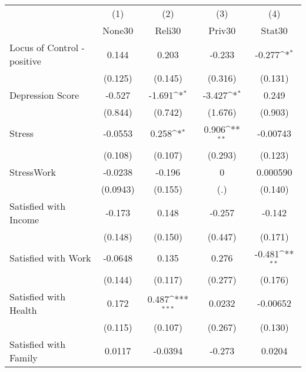 {
\def\sym#1{\ifmmode^{#1}\else\(^{#1}\)\fi}
\begin{tabular}{l*{4}{c}}
\hline\hline
            &\multicolumn{1}{c}{(1)}&\multicolumn{1}{c}{(2)}&\multicolumn{1}{c}{(3)}&\multicolumn{1}{c}{(4)}\\
            &\multicolumn{1}{c}{None30}&\multicolumn{1}{c}{Reli30}&\multicolumn{1}{c}{Priv30}&\multicolumn{1}{c}{Stat30}\\
\hline
Locus of Control - positive&       0.144         &       0.203         &      -0.233         &      -0.277\sym{*}  \\
            &     (0.125)         &     (0.145)         &     (0.316)         &     (0.131)         \\
[1em]
Depression Score&      -0.527         &      -1.691\sym{*}  &      -3.427\sym{*}  &       0.249         \\
            &     (0.844)         &     (0.742)         &     (1.676)         &     (0.903)         \\
[1em]
Stress      &     -0.0553         &       0.258\sym{*}  &       0.906\sym{**} &    -0.00743         \\
            &     (0.108)         &     (0.107)         &     (0.293)         &     (0.123)         \\
[1em]
StressWork  &     -0.0238         &      -0.196         &           0         &    0.000590         \\
            &    (0.0943)         &     (0.155)         &         (.)         &     (0.140)         \\
[1em]
Satisfied with Income&      -0.173         &       0.148         &      -0.257         &      -0.142         \\
            &     (0.148)         &     (0.150)         &     (0.447)         &     (0.171)         \\
[1em]
Satisfied with Work&     -0.0648         &       0.135         &       0.276         &      -0.481\sym{**} \\
            &     (0.144)         &     (0.117)         &     (0.277)         &     (0.176)         \\
[1em]
Satisfied with Health&       0.172         &       0.487\sym{***}&      0.0232         &    -0.00652         \\
            &     (0.115)         &     (0.107)         &     (0.267)         &     (0.130)         \\
[1em]
Satisfied with Family&      0.0117         &     -0.0394         &      -0.273         &      0.0204         \\

\end{tabular}}
